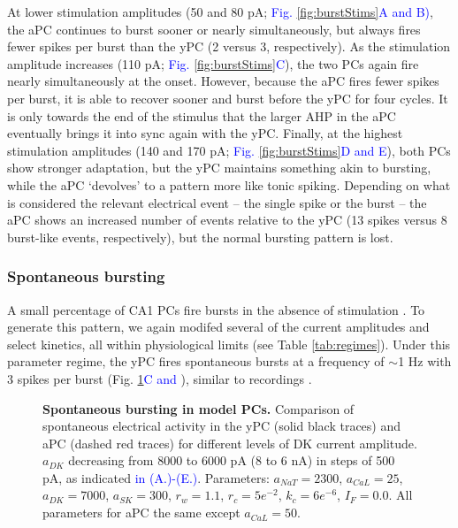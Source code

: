 \documentclass[10pt,letterpaper]{article}
\newcommand{\edit}[1]{\textcolor{blue}{#1}}
\begin{document}
At lower stimulation amplitudes (50 and 80 pA; \edit{Fig. \ref{fig:burstStims}A and B)}, the aPC continues to burst sooner or nearly simultaneously, but always fires fewer spikes per burst than the yPC (2 versus 3, respectively). As the stimulation amplitude increases (110 pA; \edit{Fig. \ref{fig:burstStims}C}), the two PCs again fire nearly simultaneously at the onset. However, because the aPC fires fewer spikes per burst, it is able to recover sooner and burst before the yPC for four cycles. It is only towards the end of the stimulus that the larger AHP in the aPC eventually brings it into sync again with the yPC. Finally, at the highest stimulation amplitudes (140 and 170 pA; \edit{Fig. \ref{fig:burstStims}D and E}), both PCs show stronger adaptation, but the yPC maintains something akin to bursting, while the aPC `devolves' to a pattern more like tonic spiking. Depending on what is considered the relevant electrical event -- the single spike or the burst -- the aPC shows an increased number of events relative to the yPC (13 spikes versus 8 burst-like events, respectively), but the normal bursting pattern is lost. 

\subsubsection*{Spontaneous bursting}
A small percentage of CA1 PCs fire bursts in the absence of stimulation \cite{jensen1994variant}. To generate this pattern, we again modifed several of the current amplitudes and select kinetics, all within physiological limits (see Table \ref{tab:regimes}). Under this parameter regime, the yPC fires spontaneous bursts at a frequency of $\sim$1 Hz with 3 spikes per burst (Fig. \ref{fig:burstingAging}\edit{C and }), similar to recordings \cite{golomb2006contribution}.

\begin{figure}[h!]
\centering
\caption{{\bf Spontaneous bursting in model PCs.}
Comparison of spontaneous electrical activity in the yPC (solid black traces) and aPC (dashed red traces) for different levels of DK current amplitude. $a_{DK}$ decreasing from 8000 to 6000 pA (8 to 6 nA) in steps of 500 pA, as indicated \edit{in (A.)-(E.)}. Parameters: $a_{NaT}=2300$, $a_{CaL}=25$, $a_{DK}=7000$, $a_{SK}=300$, $r_{w}=1.1$, $r_{c}=5e^{-2}$, $k_{c}=6e^{-6}$, $I_{F}=0.0$. All parameters for aPC the same except $a_{CaL}=50$.}
\label{fig:burstingAging}
\end{figure}
\end{document}
